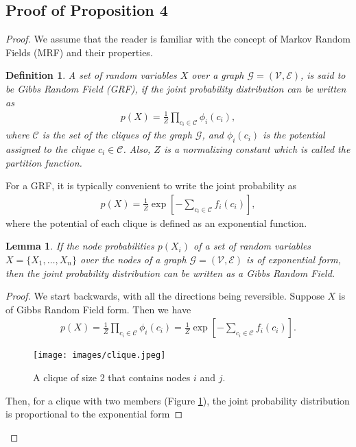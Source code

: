 \documentclass{article}
\newtheorem{lemma}{Lemma}
\newtheorem{definition}{Definition}
\begin{document}
\subsection{Proof of Proposition 4}
\begin{proof}
	We assume that the reader is familiar with the concept of Markov Random Fields (MRF) and their properties.
	\begin{definition}
		A set of random variables $X$ over a graph $\mathcal{G}=(\mathcal{V}, \mathcal{E})$, is said to be Gibbs Random Field (GRF), if the joint probability distribution can be written as
		\begin{gather}
			p(X)=\frac{1}{Z}\prod_{c_i \in \mathcal{C}}\phi_i(c_i),
		\end{gather} 
		where $\mathcal{C}$ is the set of the cliques of the graph $\mathcal{G}$, and $\phi_i(c_i)$ is the potential assigned to the clique $c_i \in \mathcal{C}$. Also, $Z$ is a normalizing constant which is called the partition function. 
	\end{definition}
	For a GRF, it is typically convenient to write the joint probability as 
	\begin{gather}
		p(X)=\frac{1}{Z}\exp[-\sum_{c_i \in \mathcal{C}}f_i(c_i)],
	\end{gather} 	
	where the potential of each clique is defined as an exponential function.
	\begin{lemma}\label{lemma:prop4}
		If the node probabilities $p(X_i)$ of a set of random variables $X=\{X_1, \dots, X_n\}$ over the nodes of a graph $\mathcal{G}=(\mathcal{V}, \mathcal{E})$ is of exponential form, then the joint probability distribution can be written as a Gibbs Random Field.
	\end{lemma}
	\begin{proof}
		We start backwards, with all the directions being reversible. Suppose $X$ is of Gibbs Random Field form. Then we have
		\begin{gather}
			p(X)=\frac{1}{Z}\prod_{c_i \in \mathcal{C}}\phi_i(c_i)=\frac{1}{Z}\exp[-\sum_{c_i \in \mathcal{C}}f_i(c_i)].
		\end{gather}
		\begin{figure}[t]
			\begin{center}
				\texttt{[image: images/clique.jpeg]}
				\caption{A clique of size 2 that contains nodes $i$ and $j$.}
				\label{fig:clique}
			\end{center}
		\end{figure} 	
		Then, for a clique with two members (Figure \ref{fig:clique}), the joint probability distribution is proportional to the exponential form

\end{proof}
\end{proof}
\end{document}
